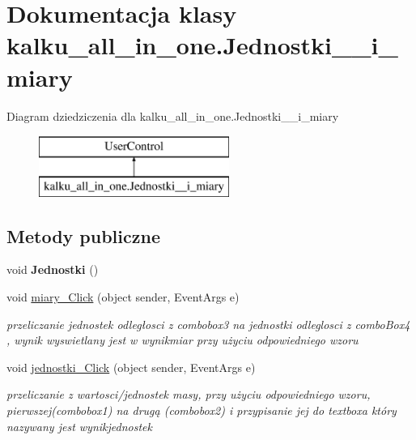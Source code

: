 \hypertarget{classkalku__all__in__one_1_1_jednostki____i__miary}{}\section{Dokumentacja klasy kalku\+\_\+all\+\_\+in\+\_\+one.\+Jednostki\+\_\+\+\_\+i\+\_\+miary}
\label{classkalku__all__in__one_1_1_jednostki____i__miary}
Diagram dziedziczenia dla kalku\+\_\+all\+\_\+in\+\_\+one.\+Jednostki\+\_\+\+\_\+i\+\_\+miary\begin{figure}[H]
\begin{center}
\leavevmode
\includegraphics[height=2.000000cm]{classkalku__all__in__one_1_1_jednostki____i__miary}
\end{center}
\end{figure}
\subsection*{Metody publiczne}
\begin{DoxyCompactItemize}
\item 
\mbox{\label{classkalku__all__in__one_1_1_jednostki____i__miary_a1833f471d48b1dd756ac2bed4c01831b}} 
void {\bfseries Jednostki} ()
\item 
\mbox{\label{classkalku__all__in__one_1_1_jednostki____i__miary_a93f4601d9dccb1177f13d7d4cc8c43db}} 
void \mbox{\hyperlink{classkalku__all__in__one_1_1_jednostki____i__miary_a93f4601d9dccb1177f13d7d4cc8c43db}{miary\+\_\+\+Click}} (object sender, Event\+Args e)
\begin{DoxyCompactList}\small\item\em przeliczanie jednostek odległosci z combobox3 na jednostki odleglosci z combo\+Box4 , wynik wyswietlany jest w wynikmiar przy użyciu odpowiedniego wzoru \end{DoxyCompactList}\item 
\mbox{\label{classkalku__all__in__one_1_1_jednostki____i__miary_a2cded9f3d6a2ab2d8c0b3ca91a31a8b4}} 
void \mbox{\hyperlink{classkalku__all__in__one_1_1_jednostki____i__miary_a2cded9f3d6a2ab2d8c0b3ca91a31a8b4}{jednostki\+\_\+\+Click}} (object sender, Event\+Args e)
\begin{DoxyCompactList}\small\item\em przeliczanie z wartosci/jednostek masy, przy użyciu odpowiedniego wzoru, pierwszej(combobox1) na drugą (combobox2) i przypisanie jej do textboxa który nazywany jest wynikjednostek \end{DoxyCompactList}\end{DoxyCompactItemize}
